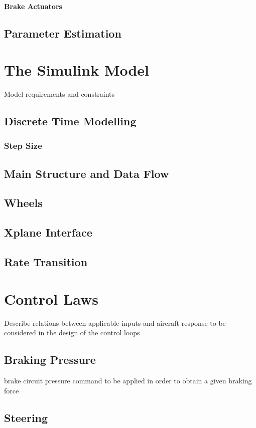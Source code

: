 \documentclass[12pt,a4paper]{report}
\begin{document}
\subsubsection{Brake Actuators}

\section{Parameter Estimation}


\chapter{The Simulink Model} \label{c:model}
Model requirements and constraints
\section{Discrete Time Modelling} \label{discrete}
\subsection{Step Size}
\section{Main Structure and Data Flow}
\section{Wheels} \label{model:wheels}
\section{Xplane Interface}
\section{Rate Transition}

\chapter{Control Laws}
Describe relations between applicable inputs and aircraft response to be considered in the design of the control loops
\section{Braking Pressure}
brake circuit pressure command to be applied in order to obtain a given braking force
\section{Steering}
\end{document}
